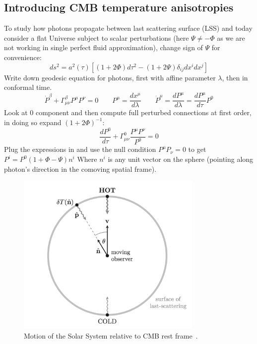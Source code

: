 \subsection{Introducing CMB temperature anisotropies}\label{sec:CMBAnisotropies}
To study how photons propagate between last scattering surface (LSS) and today consider a flat Universe subject to scalar perturbations (here $\Psi \neq -\Phi$ as we are not working in single perfect fluid approximation), change sign of $\Psi$ for convenience:
\begin{equation}
    ds^2 = a^2(\tau)\left[\left(1+2\Phi\right)d\tau^2 - \left(1+2\Psi\right) \delta_{ij} dx^idx^j\right]
\end{equation}
Write down geodesic equation for photons, first with affine parameter $\lambda$, then in conformal time.
\begin{equation}
    \dot{P}^\beta + \Gamma^\beta_{\mu\nu}P^\mu P^\nu = 0 \qquad P^\mu= \frac{dx^\mu}{d \lambda} \qquad \dot{P}^\mu= \frac{dP^\mu}{d \lambda} = \frac{dP^\mu}{d \tau} P^0
\end{equation} 
Look at $0$ component and then compute full perturbed connections at first order, in doing so expand $(1+2\Phi)^{-1}$:
\begin{equation}
   \frac{dP^0}{d \tau} + \Gamma^0_{\mu\nu}\frac{P^\mu P^\nu}{P^0} = 0 
\end{equation}
Plug the expressions in and use the null condition $P^{\mu}P_{\nu}=0$ to get $P^i = P^0 \left(1+\Phi -\Psi \right) n^i$ 
Where $n^i$ is any unit vector on the sphere (pointing along photon's direction in the comoving spatial frame).
\begin{figure}[h] 
      \centering  
        \includegraphics[width=0.8\textwidth]{Graphics/CMB-doppler.png}
        \caption{Motion of the Solar System relative to CMB rest frame~\cite{CosmologyBau}.}
  \end{figure}
